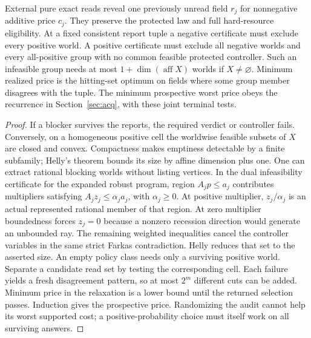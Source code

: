 \begin{theorem}\label{flag:p2}
External pure exact reads reveal one previously unread field \(r_j\) for nonnegative additive price \(c_j\). They preserve the protected law and full hard-resource eligibility. At a fixed consistent report tuple a negative certificate must exclude every positive world. A positive certificate must exclude all negative worlds and every all-positive group with no common feasible protected controller. Such an infeasible group needs at most \(1+\dim(\operatorname{aff}X)\) worlds if \(X\ne\varnothing\). Minimum realized price is the hitting-set optimum on fields where some group member disagrees with the tuple. The minimum prospective worst price obeys the recurrence in Section~\ref{sec:acq}, with these joint terminal tests.
\end{theorem}
\begin{proof}
If a blocker survives the reports, the required verdict or controller fails. Conversely, on a homogeneous positive cell the worldwise feasible subsets of \(X\) are closed and convex. Compactness makes emptiness detectable by a finite subfamily; Helly's theorem bounds its size by affine dimension plus one. One can extract rational blocking worlds without listing vertices. In the dual infeasibility certificate for the expanded robust program, region \(A_j p\le a_j\) contributes multipliers satisfying \(A_j z_j\le\alpha_j a_j\), with \(\alpha_j\ge0\). At positive multiplier, \(z_j/\alpha_j\) is an actual represented rational member of that region. At zero multiplier boundedness forces \(z_j=0\) because a nonzero recession direction would generate an unbounded ray. The remaining weighted inequalities cancel the controller variables in the same strict Farkas contradiction. Helly reduces that set to the asserted size. An empty policy class needs only a surviving positive world. Separate a candidate read set by testing the corresponding cell. Each failure yields a fresh disagreement pattern, so at most \(2^m\) different cuts can be added. Minimum price in the relaxation is a lower bound until the returned selection passes. Induction gives the prospective price. Randomizing the audit cannot help its worst supported cost; a positive-probability choice must itself work on all surviving answers.
\end{proof}

